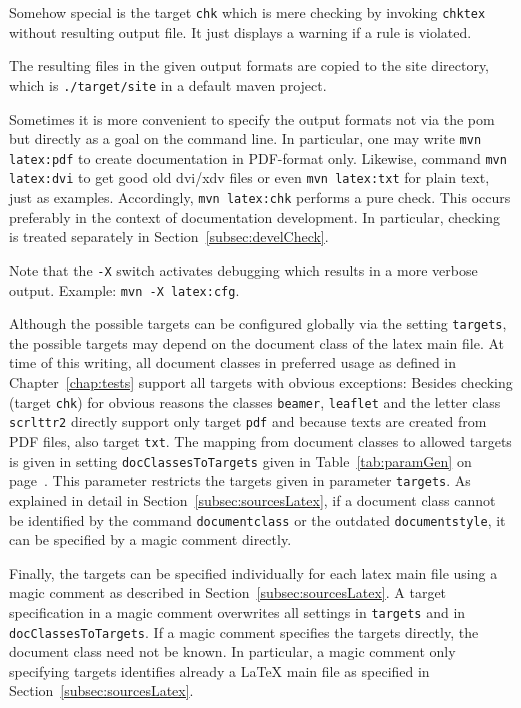 Somehow special is the target \texttt{chk} 
which is mere checking by invoking \texttt{chktex} 
without resulting output file. 
It just displays a warning if a rule is violated. 

The resulting files in the given output formats 
are copied to the site directory, 
which is \texttt{./target/site} in a default maven project. 

Sometimes it is more convenient 
to specify the output formats not via the pom 
but directly as a goal on the command line. 
In particular, one may write \texttt{mvn latex:pdf} to create documentation 
in PDF-format only.
Likewise, command \texttt{mvn latex:dvi} to get good old dvi/xdv files
or even \texttt{mvn latex:txt} for plain text, just as examples. 
Accordingly, \texttt{mvn latex:chk} performs a pure check. 
This occurs preferably in the context of documentation development. 
In particular, checking is treated separately in Section~\ref{subsec:develCheck}. 

Note that the \texttt{-X} switch activates debugging 
which results in a more verbose output. 
Example: \texttt{mvn -X latex:cfg}. 

Although the possible targets can be configured globally 
via the setting \texttt{targets}, 
the possible targets may depend on the document class of the latex main file. 
At time of this writing, 
all document classes in preferred usage as defined in Chapter~\ref{chap:tests} 
support all targets with obvious exceptions: 
Besides checking (target \texttt{chk}) for obvious reasons 
the classes \texttt{beamer}, \texttt{leaflet} and the letter class \texttt{scrlttr2} 
directly support only target \texttt{pdf} 
and because texts are created from PDF files, also target \texttt{txt}. 
The mapping from document classes to allowed targets 
is given in setting \texttt{docClassesToTargets} given in 
Table~\ref{tab:paramGen} on page~\pageref{tab:paramGen}. 
This parameter restricts the targets given in parameter \texttt{targets}. 
As explained in detail in  Section~\ref{subsec:sourcesLatex}, 
if a document class cannot be identified by the command \texttt{documentclass} 
or the outdated \texttt{documentstyle}, 
it can be specified by a magic comment directly. 

Finally, the targets can be specified individually for each latex main file 
using a magic comment as described in Section~\ref{subsec:sourcesLatex}. 
A target specification in a magic comment overwrites all settings in 
\texttt{targets} and in \texttt{docClassesToTargets}. 
If a magic comment specifies the targets directly, 
the document class need not be known. 
In particular, a magic comment only specifying targets identifies already a \LaTeX{} main file 
as specified in Section~\ref{subsec:sourcesLatex}. 

